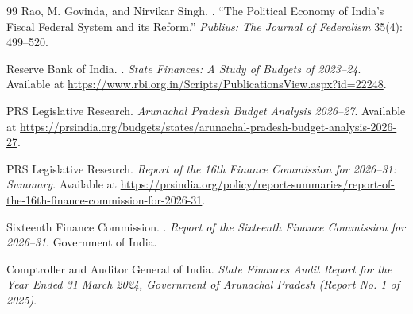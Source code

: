 \documentclass[11pt,a4paper]{article}
\begin{document}
\begin{thebibliography}{99}
Rao, M. Govinda, and Nirvikar Singh.
.
\newblock ``The Political Economy of India's Fiscal Federal System and its Reform.''
\newblock \emph{Publius: The Journal of Federalism} 35(4): 499--520.

Reserve Bank of India.
.
\newblock \emph{State Finances: A Study of Budgets of 2023--24}.
\newblock Available at \url{https://www.rbi.org.in/Scripts/PublicationsView.aspx?id=22248}.

PRS Legislative Research.
\newblock \emph{Arunachal Pradesh Budget Analysis 2026--27}.
\newblock Available at \url{https://prsindia.org/budgets/states/arunachal-pradesh-budget-analysis-2026-27}.

PRS Legislative Research.
\newblock \emph{Report of the 16th Finance Commission for 2026--31: Summary}.
\newblock Available at \url{https://prsindia.org/policy/report-summaries/report-of-the-16th-finance-commission-for-2026-31}.

Sixteenth Finance Commission.
.
\newblock \emph{Report of the Sixteenth Finance Commission for 2026--31}.
\newblock Government of India.

Comptroller and Auditor General of India.
\newblock \emph{State Finances Audit Report for the Year Ended 31 March 2024, Government of Arunachal Pradesh (Report No. 1 of 2025)}.

\end{thebibliography}
\end{document}
